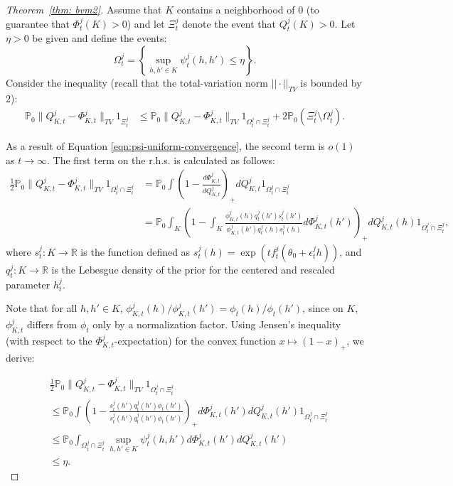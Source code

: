 \documentclass[twoside,11pt]{article}
\numberwithin{equation}{section}
\newcommand{\R}{{\mathbb{R}}}
\newcommand\bP{\mathbb{P}}
\begin{document}
{\begin{proof}[Theorem~\ref{thm: bvm2}]
Assume that $K$ contains a neighborhood of $0$ (to guarantee that $\Phi_t^j(K) > 0$) and let $\Xi_t^j$ denote the event that $Q_t^j(K) > 0$. Let $\eta > 0$ be given and define the events:
\begin{equation*}
\Omega_t^j = \left\{ \sup_{h,h' \in K} \psi_t^j(h, h') \leq \eta \right\}.
\end{equation*}
Consider the inequality (recall that the total-variation norm $||\cdot||_{TV}$ is bounded by $2$):
\begin{align}
\bP_0 \| Q_{K,t}^j - \Phi_{K,t}^j \|_{TV} 1_{\Xi_t^j}
&\leq \bP_0 \| Q_{K,t}^j - \Phi_{K,t}^j \|_{TV} 1_{\Omega_t^j \cap \Xi_t^j} + 2\bP_0(\Xi_t^j \setminus \Omega_t^j). \label{eqn:inequality}
\end{align}

As a result of Equation \eqref{eqn:psi-uniform-convergence}, the second term is $o(1)$ as $t \to \infty$. The first term on the r.h.s. is calculated as follows:
\begin{align*}
\frac{1}{2}\bP_0 \| Q_{K,t}^j - \Phi_{K,t}^j \|_{TV} 1_{\Omega_t^j \cap \Xi_t^j} 
&= \bP_0 \int \left(1 - \frac{d\Phi_{K,t}^j}{dQ_{K,t}^j}\right)_+ dQ_{K,t}^j 1_{\Omega_t^j \cap \Xi_t^j} \\
&= \bP_0 \int_K \left(1 - \int_K\frac{ \phi_{K,t}^j(h) q_t^j(h') s_t^j(h')}{\phi_{K,t}^j(h') q_t^j(h)s_t^j(h)} d\Phi_{K,t}^j(h') \right)_+  dQ_{K,t}^j(h) 1_{\Omega_t^j \cap \Xi_t^j},
\end{align*}
where $s_t^j: K \rightarrow \R$ is the function defined as $s_t^j(h) = \exp(t f_t^j(\theta_0 + \epsilon_t^j h))$, and $q_t^j: K \rightarrow \R$ is the Lebesgue density of the prior for the centered and rescaled parameter $h_t^j$.

Note that for all $h, h' \in K$, $\phi_{K,t}^j(h)/\phi_{K,t}^j(h') = \phi_t(h)/\phi_t(h')$, since on $K$, $\phi_{K,t}^j$ differs from $\phi_t$ only by a normalization factor. Using Jensen's inequality (with respect to the $\Phi_{K,t}^j$-expectation) for the convex function $x \mapsto (1 - x)_+$, we derive:

\begin{align*}
&\frac{1}{2} \bP_0 \| Q_{K,t}^j - \Phi_{K,t}^j \|_{TV} 1_{\Omega_t^j \cap \Xi_t^j} \\
&\leq \bP_0 \int \left(1 - \frac{s_t^j(h') q_t^j(h') \phi_t(h')}{s_t^j(h') q_t^j(h') \phi_t(h')}\right)_+ d\Phi_{K,t}^j(h') dQ_{K,t}^j(h') 1_{\Omega_t^j \cap \Xi_t^j} \\
&\leq \bP_0 \int_{\Omega_t^j \cap \Xi_t^j}\sup_{h,h' \in K} \psi_t^j(h, h')  d\Phi_{K,t}^j(h') dQ_{K,t}^j(h') \\
&\leq \eta.
\end{align*}


\end{proof}}
\end{document}
